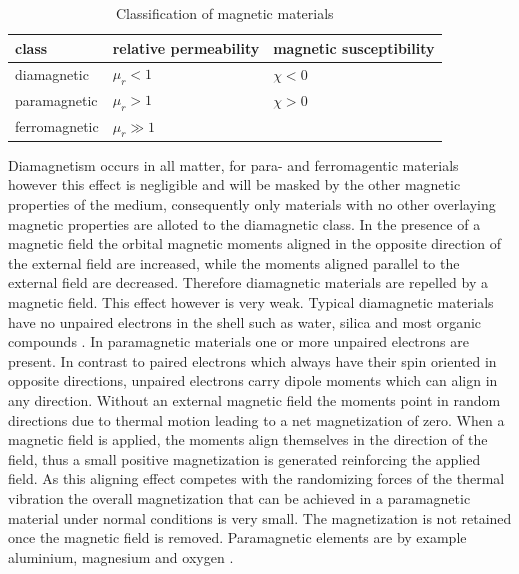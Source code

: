 \begin{table}[H]
\centering
\caption{Classification of magnetic materials}
\label{table:mag_material}
\begin{tabular}{lll}\hline
class & relative permeability & magnetic susceptibility \\
\hline\hline
diamagnetic & $\mu_{r}<1$ & $\chi<0$ \\
paramagnetic & $\mu_{r}>1$ & $\chi>0$ \\
ferromagnetic & $\mu_{r}\gg1$ &  \\
\hline
\end{tabular}
\end{table}

Diamagnetism occurs in all matter, for para- and ferromagentic materials however this effect is negligible and will be masked by the other magnetic properties of the medium, consequently only materials with no other overlaying magnetic properties are alloted to the diamagnetic class. In the presence of a magnetic field the orbital magnetic moments aligned in the opposite direction of the external field are increased, while the moments aligned parallel to the external field are decreased. Therefore diamagnetic materials are repelled by a magnetic field. This effect however is very weak. Typical diamagnetic materials have no unpaired electrons in the shell such as water, silica and most organic compounds \cite{svoboda2004magnetic}\cite{griffiths2011elektrodynamik}.\newline
In paramagnetic materials one or more unpaired electrons are present. In contrast to paired electrons which always have their spin oriented in opposite directions, unpaired electrons carry dipole moments which can align in any direction. Without an external magnetic field the moments point in random directions due to thermal motion leading to a net magnetization of zero. When a magnetic field is applied, the moments align themselves in the direction of the field, thus a small positive magnetization is generated reinforcing the applied field. As this aligning effect competes with the randomizing forces of the thermal vibration the overall magnetization that can be achieved in a paramagnetic material under normal conditions is very small. The magnetization is not retained once the magnetic field is removed. Paramagnetic elements are by example aluminium, magnesium and oxygen \cite{svoboda2004magnetic}\cite{griffiths2011elektrodynamik}.\newline  %
